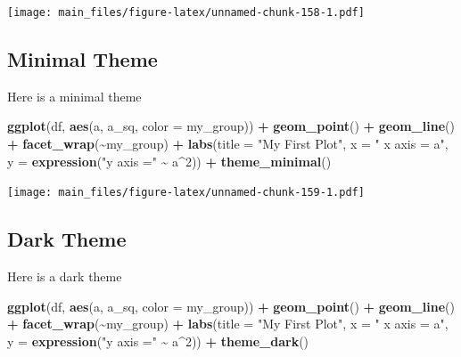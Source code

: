 \documentclass[
]{book}
\newenvironment{Shaded}{\begin{snugshade}}{\end{snugshade}}
\newcommand{\AttributeTok}[1]{\textcolor[rgb]{0.13,0.29,0.53}{#1}}
\newcommand{\DecValTok}[1]{\textcolor[rgb]{0.00,0.00,0.81}{#1}}
\newcommand{\FunctionTok}[1]{\textcolor[rgb]{0.13,0.29,0.53}{\textbf{#1}}}
\newcommand{\NormalTok}[1]{#1}
\newcommand{\SpecialCharTok}[1]{\textcolor[rgb]{0.81,0.36,0.00}{\textbf{#1}}}
\newcommand{\StringTok}[1]{\textcolor[rgb]{0.31,0.60,0.02}{#1}}
\begin{document}
\texttt{[image: main\_files/figure-latex/unnamed-chunk-158-1.pdf]}

\subsection{Minimal Theme}\label{minimal-theme}

Here is a minimal theme

\begin{Shaded}
\begin{Highlighting}[]
\FunctionTok{ggplot}\NormalTok{(df, }\FunctionTok{aes}\NormalTok{(a, a\_sq, }\AttributeTok{color =}\NormalTok{ my\_group)) }\SpecialCharTok{+} \FunctionTok{geom\_point}\NormalTok{()  }\SpecialCharTok{+} \FunctionTok{geom\_line}\NormalTok{() }\SpecialCharTok{+} \FunctionTok{facet\_wrap}\NormalTok{(}\SpecialCharTok{\textasciitilde{}}\NormalTok{my\_group) }\SpecialCharTok{+}
  \FunctionTok{labs}\NormalTok{(}\AttributeTok{title =} \StringTok{"My First Plot"}\NormalTok{, }\AttributeTok{x =} \StringTok{" x axis = a"}\NormalTok{, }\AttributeTok{y =} \FunctionTok{expression}\NormalTok{(}\StringTok{"y axis ="} \SpecialCharTok{\textasciitilde{}}\NormalTok{ a}\SpecialCharTok{\^{}}\DecValTok{2}\NormalTok{)) }\SpecialCharTok{+}
  \FunctionTok{theme\_minimal}\NormalTok{()}
\end{Highlighting}
\end{Shaded}

\texttt{[image: main\_files/figure-latex/unnamed-chunk-159-1.pdf]}

\subsection{Dark Theme}\label{dark-theme}

Here is a dark theme

\begin{Shaded}
\begin{Highlighting}[]
\FunctionTok{ggplot}\NormalTok{(df, }\FunctionTok{aes}\NormalTok{(a, a\_sq, }\AttributeTok{color =}\NormalTok{ my\_group)) }\SpecialCharTok{+} \FunctionTok{geom\_point}\NormalTok{()  }\SpecialCharTok{+} \FunctionTok{geom\_line}\NormalTok{() }\SpecialCharTok{+} \FunctionTok{facet\_wrap}\NormalTok{(}\SpecialCharTok{\textasciitilde{}}\NormalTok{my\_group) }\SpecialCharTok{+}
  \FunctionTok{labs}\NormalTok{(}\AttributeTok{title =} \StringTok{"My First Plot"}\NormalTok{, }\AttributeTok{x =} \StringTok{" x axis = a"}\NormalTok{, }\AttributeTok{y =} \FunctionTok{expression}\NormalTok{(}\StringTok{"y axis ="} \SpecialCharTok{\textasciitilde{}}\NormalTok{ a}\SpecialCharTok{\^{}}\DecValTok{2}\NormalTok{)) }\SpecialCharTok{+}
  \FunctionTok{theme\_dark}\NormalTok{()}
\end{Highlighting}
\end{Shaded}
\end{document}
